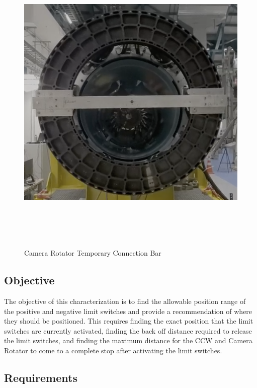 \documentclass[SE,lsstdraft,authoryear,toc]{lsstdoc}
\begin{document}
\begin{figure}
\begin{center}
  \includegraphics[width=6.5in,height=5.96389in]{media/Figure_2.png}
\end{center}
\caption{Camera Rotator Temporary Connection Bar}
\label{fig:Figure_2}
\end{figure}

\subsection{Objective}

The objective of this characterization is to find the allowable position
range of the positive and negative limit switches and provide a
recommendation of where they should be positioned. This requires finding
the exact position that the limit switches are currently activated,
finding the back off distance required to release the limit switches,
and finding the maximum distance for the CCW and Camera Rotator to come
to a complete stop after activating the limit switches.

\subsection{Requirements}
\end{document}
